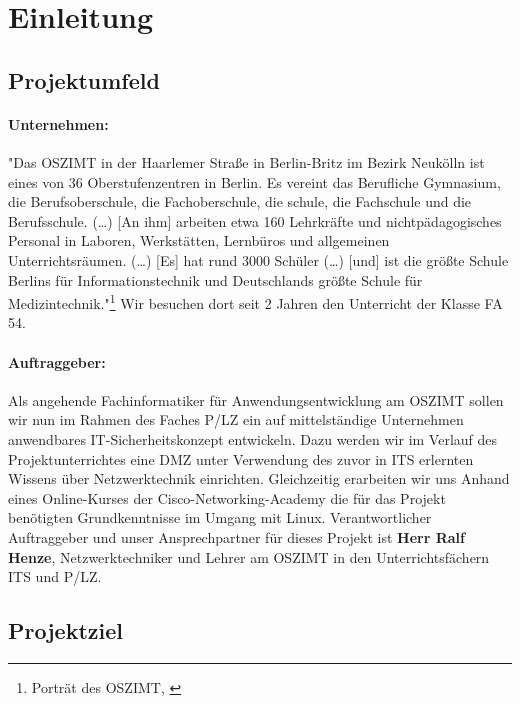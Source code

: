 \section{Einleitung}
\label{sec:Einleitung}

\subsection{Projektumfeld} 
\label{sec:Projektumfeld}
\paragraph*{Unternehmen: } "Das \ac{OSZIMT} in der Haarlemer Straße in Berlin-Britz im Bezirk Neukölln ist eines von 36 Oberstufenzentren in Berlin. Es vereint das Berufliche Gymnasium, die Berufsoberschule, die Fachoberschule, die schule, die Fachschule und die Berufsschule. (\dots)
[An ihm] arbeiten etwa 160 Lehrkräfte und nichtpädagogisches Personal in Laboren, Werkstätten, Lernbüros und allgemeinen Unterrichtsräumen. (\dots)
[Es] hat rund 3000 Schüler (\dots) [und] ist die größte Schule Berlins für Informationstechnik und Deutschlands größte Schule für Medizintechnik."\footnote{Porträt des \ac{OSZIMT}, \cite{oszimtDe} }
Wir besuchen dort seit 2  Jahren den Unterricht der Klasse \ac{FA} 54.
\paragraph*{Auftraggeber: } Als angehende Fachinformatiker für Anwendungsentwicklung am \ac{OSZIMT} sollen wir nun im Rahmen des Faches \ac{P/LZ} ein auf mittelständige Unternehmen anwendbares \ac{IT}-Sicherheitskonzept entwickeln. Dazu werden wir im Verlauf des Projektunterrichtes eine \ac{DMZ} unter Verwendung des zuvor in \ac{ITS} erlernten Wissens über Netzwerktechnik einrichten.  Gleichzeitig erarbeiten wir uns Anhand eines Online-Kurses der Cisco-Networking-Academy die für das Projekt benötigten Grundkenntnisse im Umgang mit Linux. Verantwortlicher Auftraggeber und unser Ansprechpartner für dieses Projekt ist \textbf{Herr Ralf Henze}, Netzwerktechniker und Lehrer am \ac{OSZIMT} in den Unterrichtsfächern \ac{ITS} und \ac{P/LZ}.

\subsection{Projektziel} 
\label{sec:Projektziel}
